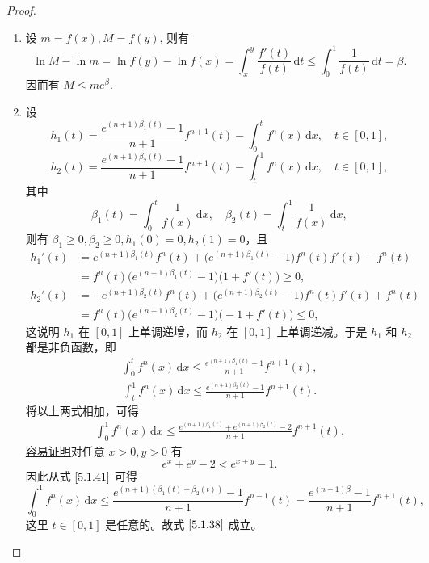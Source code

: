 \documentclass[../../main.tex]{subfiles}
\begin{document}
\begin{proof}
\begin{enumerate}
\item 设 \( m = f(x), M = f(y) \), 则有  
\[
\ln M - \ln m = \ln f(y) - \ln f(x) = \int_{x}^{y} \frac{f'(t)}{f(t)} \, \mathrm{d}t \leqslant \int_{0}^{1} \frac{1}{f(t)} \, \mathrm{d}t = \beta.
\]  
因而有 \( M \leqslant m e^{\beta} \).

\item 设  
\[
h_1(t) = \frac{e^{(n + 1)\beta_1(t)} - 1}{n + 1} f^{n + 1}(t) - \int_{0}^{t} f^n(x) \, \mathrm{d}x, \quad t \in [0,1],
\]  
\[
h_2(t) = \frac{e^{(n + 1)\beta_2(t)} - 1}{n + 1} f^{n + 1}(t) - \int_{t}^{1} f^n(x) \, \mathrm{d}x, \quad t \in [0,1],
\]  
其中  
\[
\beta_1(t) = \int_{0}^{t} \frac{1}{f(x)} \, \mathrm{d}x, \quad \beta_2(t) = \int_{t}^{1} \frac{1}{f(x)} \, \mathrm{d}x,
\]  
则有 \( \beta_1 \geqslant 0, \beta_2 \geqslant 0, h_1(0) = 0, h_2(1) = 0 \)，且  
\[
\begin{aligned}
h_1'(t) &= e^{(n + 1)\beta_1(t)} f^n(t) + \big( e^{(n + 1)\beta_1(t)} - 1 \big) f^n(t) f'(t) - f^n(t) \\
&= f^n(t) \big( e^{(n + 1)\beta_1(t)} - 1 \big) \big( 1 + f'(t) \big) \geqslant 0,
\end{aligned}
\]  
\[
\begin{aligned}
h_2'(t) &= -e^{(n + 1)\beta_2(t)} f^n(t) + \big( e^{(n + 1)\beta_2(t)} - 1 \big) f^n(t) f'(t) + f^n(t) \\
&= f^n(t) \big( e^{(n + 1)\beta_2(t)} - 1 \big) \big( -1 + f'(t) \big) \leqslant 0,
\end{aligned}
\]  
这说明 \( h_1 \) 在 \([0,1]\) 上单调递增，而 \( h_2 \) 在 \([0,1]\) 上单调递减。于是 \( h_1 \) 和 \( h_2 \) 都是非负函数，即  
\begin{align}
\int_{0}^{t} f^n(x) \, \mathrm{d}x \leqslant \frac{e^{(n + 1)\beta_1(t)} - 1}{n + 1} f^{n + 1}(t), \label{5.1.39}
\end{align}  
\begin{align}
\int_{t}^{1} f^n(x) \, \mathrm{d}x \leqslant \frac{e^{(n + 1)\beta_2(t)} - 1}{n + 1} f^{n + 1}(t). \label{5.1.40}
\end{align}  
将以上两式相加，可得  
\begin{align}
\int_{0}^{1} f^n(x) \, \mathrm{d}x \leqslant \frac{e^{(n + 1)\beta_1(t)} + e^{(n + 1)\beta_2(t)} - 2}{n + 1} f^{n + 1}(t). \label{5.1.41}
\end{align}  
\hyperref[proposition:常用不等式3]{容易证明}对任意 \( x > 0, y > 0 \) 有  
\[
e^x + e^y - 2 < e^{x + y} - 1.
\]  
因此从式 \(\eqref{5.1.41}\) 可得  
\[
\int_{0}^{1} f^n(x) \, \mathrm{d}x \leqslant \frac{e^{(n + 1)(\beta_1(t) + \beta_2(t))} - 1}{n + 1} f^{n + 1}(t) = \frac{e^{(n + 1)\beta} - 1}{n + 1} f^{n + 1}(t),
\]  
这里 \( t \in [0,1] \) 是任意的。故式 \(\eqref{5.1.38}\) 成立。
\end{enumerate}

\end{proof}
\end{document}
